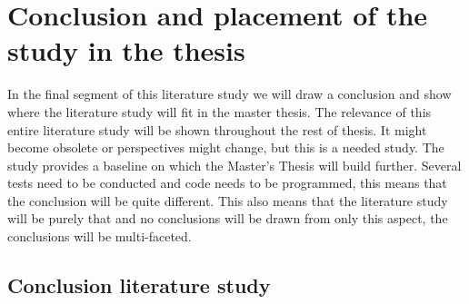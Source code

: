 

\section{Conclusion and placement of the study in the thesis}

In the final segment of this literature study we will draw a conclusion and show where the literature study will fit in the master thesis. The relevance of this entire literature study will be shown throughout the rest of thesis. It might become obsolete or perspectives might change, but this is a needed study. The study provides a baseline on which the Master's Thesis will build further. Several tests need to be conducted and code needs to be programmed, this means that the conclusion will be quite different. This also means that the literature study will be purely that and no conclusions will be drawn from only this aspect, the conclusions will be multi-faceted. 

\subsection{Conclusion literature study}

